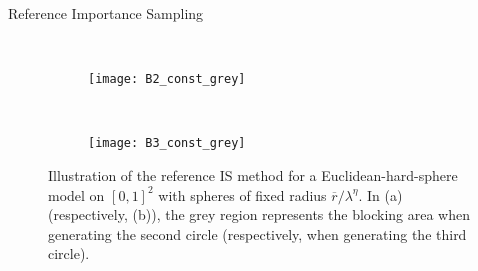 \documentclass[11pt]{article}
\newcommand{\rbdd}{\overline{r}}
\newcommand{\state}{\mathbf{X}}
\begin{document}
\begin{algorithm}
  \caption{Reference Importance Sampling}
  \label{alg:Ref_IS}
  \begin{algorithmic}[1]
  \State{$\state \leftarrow \varnothing$}
  \Repeat
    \Else
        \label{step:findingBc}
    \EndIf   
    \State{$\state \leftarrow \state \cup \{(Y_i, R_i/\lambda^\eta)\}$}  
%
    
 \EndIf\\
 
    \Return{$\state$}
    
  \end{algorithmic}
\end{algorithm}
\begin{figure}[h]
    \begin{center}
    \begin{subfigure}{0.47\textwidth}
        \begin{center}
        \texttt{[image: B2\_const\_grey]} 
        \end{center}
        \caption{}
    \end{subfigure}%
    ~
    \begin{subfigure}{0.47\textwidth}
        \begin{center}
        \texttt{[image: B3\_const\_grey]} %
        \end{center}
        \caption{}
    \end{subfigure}
    \caption{Illustration of the reference IS method for a Euclidean-hard-sphere model on $[0,1]^2$ with spheres of fixed radius $\rbdd/\lambda^\eta$.
                    In (a) (respectively, (b)), the grey region represents the blocking area when generating the second circle (respectively, when generating 
                    the third circle). }
    \label{fig:block}
   \end{center}
\end{figure}
\end{document}
